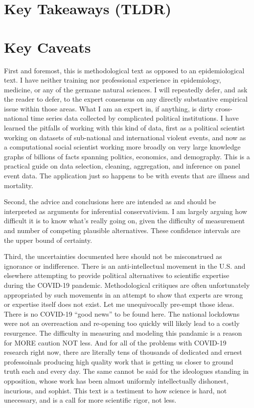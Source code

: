 \documentclass[
]{book}
\begin{document}
\hypertarget{key-takeaways-tldr}{%
\section{Key Takeaways (TLDR)}\label{key-takeaways-tldr}}

\hypertarget{key-caveats}{%
\section{Key Caveats}\label{key-caveats}}

First and foremost, this is methodological text as opposed to an epidemiological text. I have neither training nor professional experience in epidemiology, medicine, or any of the germane natural sciences. I will repeatedly defer, and ask the reader to defer, to the expert consensus on any directly substantive empirical issue within those areas. What I am an expert in, if anything, is dirty cross-national time series data collected by complicated political institutions. I have learned the pitfalls of working with this kind of data, first as a political scientist working on datasets of sub-national and international violent events, and now as a computational social scientist working more broadly on very large knowledge graphs of billions of facts spanning politics, economics, and demography. This is a practical guide on data selection, cleaning, aggregation, and inference on panel event data. The application just so happens to be with events that are illness and mortality.

Second, the advice and conclusions here are intended as and should be interpreted as arguments for inferential conservativism. I am largely arguing how difficult it is to know what's really going on, given the difficulty of measurement and number of competing plausible alternatives. These confidence intervals are the upper bound of certainty.

Third, the uncertainties documented here should not be misconstrued as ignorance or indifference. There is an anti-intellectual movement in the U.S. and elsewhere attempting to provide political alternatives to scientific expertise during the COVID-19 pandemic. Methodological critiques are often unfortunately appropriated by such movements in an attempt to show that experts are wrong or expertise itself does not exist. Let me unequivocally pre-empt those ideas. There is no COVID-19 ``good news'' to be found here. The national lockdowns were not an overreaction and re-opening too quickly will likely lead to a costly resurgence. The difficulty in measuring and modeling this pandamic is a reason for MORE caution NOT less. And for all of the problems with COVID-19 research right now, there are literally tens of thousands of dedicated and ernest professoinals producing high quality work that is getting us closer to ground truth each and every day. The same cannot be said for the ideologues standing in opposition, whose work has been almost uniformly intellectually dishonest, incurious, and sophist. This text is a testiment to how science is hard, not unecessary, and is a call for more scientific rigor, not less.
\end{document}
